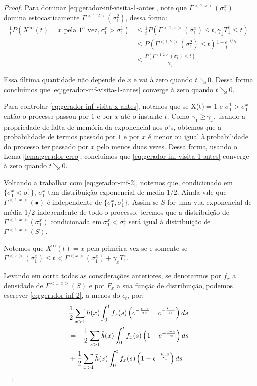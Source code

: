\begin{proof}
  Para dominar \eqref{eq:gerador-inf-visita-1-antes}, note que
  $\Gamma^{<1, x>}(\sigma_1^x)$ domina estocasticamente $\Gamma^{<1,
    2>}(\sigma_1^2)$, dessa forma:
  \begin{align*}
    \frac{1}{t} P\left(
      X^\infty(t) = x \text{ pela } 1^a \text{ vez},
      \sigma^x_1 > \sigma^1_1
    \right)
    & \leq \frac{1}{t} P(\Gamma^{<1, x>}(\sigma^x_1) \leq t, \gamma_1 T^1_1 \leq
    t)\\
    &\leq P(\Gamma^{<1, 2>}(\sigma^2_1) \leq t) \frac{1 -
      e^{-t/\gamma_1}}{t}\\
    &\leq \frac{P(\Gamma^{<1, 2>}(\sigma^2_1) \leq t)}{\gamma_1}.
  \end{align*}

  Essa última quantidade não depende de $x$ e vai à zero quando $t
  \searrow 0$. Dessa forma concluímos que
  \eqref{eq:gerador-inf-visita-1-antes} converge à zero quando $t
  \searrow 0$.    

  Para controlar \eqref{eq:gerador-inf-visita-x-antes}, notemos que se
  X(t) = 1 e $\sigma_1^1 > \sigma_1^x$ então o processo passou por $1$
  e por $x$ até o instante $t$. Como $\gamma_1 \geq \gamma_x$, usando
  a propriedade de falta de memória da exponencial nos $\sigma$'s,
  obtemos que a probabilidade de termos passado por $1$ e por $x$ é
  menor ou igual à probabilidade do processo ter passado por $x$ pelo
  menos duas vezes. Dessa forma, usando o Lema
  \ref{lema:gerador-erro}, concluímos que
  \eqref{eq:gerador-inf-visita-1-antes} converge à zero quando $t
  \searrow 0$.

  
  Voltando a trabalhar com \eqref{eq:gerador-inf-2}, notemos que,
  condicionado em $\{\sigma^x_1 < \sigma^1_1\}$, $\sigma^x_1$ tem
  distribuição exponencial de média $1/2$. Ainda vale que $\Gamma^{<1,
    x>}(\bullet)$ é independente de $\{\sigma^x_1,
  \sigma^1_1\}$. Assim se $S$ for uma v.a. exponencial de média $1/2$
  independente de todo o processo, teremos que a distribuição de
  $\Gamma^{<1, x>}(\sigma_1^x)$ condicionada em $\sigma^x_1 <
  \sigma_1^1$ será igual à distribuição de $\Gamma^{<1, x>}(S)$.


  Notemos que $X^\infty(t) = x$ pela primeira vez se e somente se
  $\Gamma^{<x>}(\sigma^x_1) \leq t < \Gamma^{<x>}(\sigma^x_1) +
  \gamma_x T^x_1$.

  Levando em conta todas as considerações anteriores, se denotarmos
  por $f_x$ a densidade de $\Gamma^{<1, x>}(S)$ e por $F_x$ a sua
  função de distribuição, podemos escrever \eqref{eq:gerador-inf-2}, a
  menos do $\epsilon_t$, por:
  \begin{align}
    & \frac{1}{2} \sum_{x > 1} \bar{h}(x) \int_0^t f_x (s) \left(
      e^{-\frac{t-s}{\gamma_x}} - e^{-\frac{t-s}{\gamma_1}}
    \right) d s \notag\\
    \label{eq:gerador-inf-3}
    &= - \frac{1}{2} \sum_{x > 1} \bar{h}(x) \int_0^t f_x (s) \left(
      1 - e^{-\frac{t-s}{\gamma_x}}
    \right) d s\\
    \label{eq:gerador-inf-4}
    &+ \frac{1}{2} \sum_{x > 1} \bar{h}(x) \int_0^t f_x (s) \left(
      1 - e^{-\frac{t-s}{\gamma_1}}
    \right) d s
  \end{align}



\end{proof}
